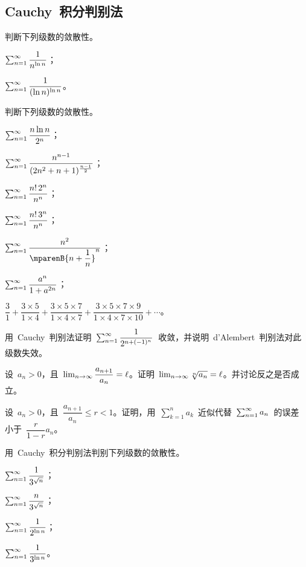 \subsection{Cauchy~积分判别法}
\begin{exercise}
\item 判断下列级数的敛散性。
\begin{exlistcols}
  \item $\sum_{n=1}^\infty\dfrac1{n^{\ln n}}$；
  \item $\sum_{n=1}^\infty\dfrac1{(\ln n)^{\ln n}}$。
\end{exlistcols}
\item 判断下列级数的敛散性。
\begin{exlistcols}[3]
  \item $\sum_{n=1}^\infty\dfrac{n\ln n}{2^n}$；
  \item $\sum_{n=1}^\infty\dfrac{n^{n-1}}{(2n^2+n+1)^{\frac{n-1}2}}$；
  \item $\sum_{n=1}^\infty\dfrac{n!\,2^n}{n^n}$；
  \item $\sum_{n=1}^\infty\dfrac{n!\,3^n}{n^n}$；
  \item $\sum_{n=1}^\sinf\dfrac{n^2}{\mparenB{n+\dfrac1n}^n}$；
  \item $\sum_{n=1}^\infty\dfrac{a^n}{1+a^{2n}}$；
  \item $\dfrac31+\dfrac{3\times 5}{1\times 4}+\dfrac{3\times5\times7}{1\times4\times7}+
         \dfrac{3\times5\times7\times9}{1\times4\times7\times10}+\dotsb$。
\end{exlistcols}
\item 用~Cauchy~判别法证明~$\sum_{n=1}^\infty\dfrac1{2^{n+(-1)^n}}$~收敛，并说明~d'Alembert~判别法对此级数失效。
\item 设~$a_n>0$，且~$\lim_{n\to\infty}\dfrac{a_{n+1}}{a_n}=\ell$。证明~$\lim_{n\to\infty}\sqrt[n]{a_n}=\ell$。并讨论反之是否成立。
\item 设~$a_n>0$，且~$\dfrac{a_{n+1}}{a_n}\leq r<1$。证明，用~$\sum_{k=1}^na_k$~近似代替~$\sum_{n=1}^\infty a_n$~的误差
小于~$\dfrac r{1-r}a_n$。
\item 用~Cauchy~积分判别法判别下列级数的敛散性。
\begin{exlistcols}[4]
  \item $\sum_{n=1}^\infty\dfrac1{3^{\sqrt n}}$；
  \item $\sum_{n=1}^\infty\dfrac n{3^{\sqrt n}}$；
  \item $\sum_{n=1}^\infty\dfrac1{2^{\ln n}}$；
  \item $\sum_{n=1}^\infty\dfrac1{3^{\ln n}}$。
\end{exlistcols}

\end{exercise}
